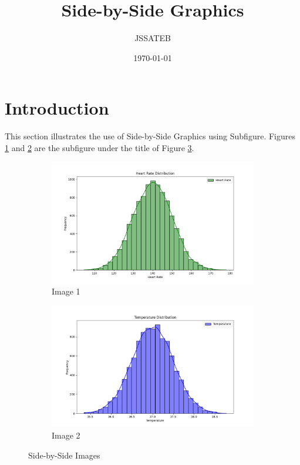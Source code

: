 \documentclass{article}
\title{Side-by-Side Graphics}
\author{JSSATEB}
\date{\today}
\begin{document}
	\maketitle

	\section{Introduction}
		This section illustrates the use of Side-by-Side Graphics using Subfigure. Figures \ref{fig:image1} and \ref{fig:image2} are the subfigure under the title of Figure \ref{fig:sidebyside}.
		\begin{figure}[h!]
   			 \centering
    		\begin{subfigure}[b]{0.45\textwidth}
       			 \includegraphics[width=\textwidth]{Individual prog heat.png}
       			 \caption{Image 1}
       			 \label{fig:image1}
   			 \end{subfigure}
   			 \begin{subfigure}[b]{0.45\textwidth}
       				 \includegraphics[width=\textwidth]{Temperature Distribution.png}
       				 \caption{Image 2}
       				 \label{fig:image2}
    		\end{subfigure}
    		\caption{Side-by-Side Images}
   			 \label{fig:sidebyside}
		\end{figure}
\end{document}
